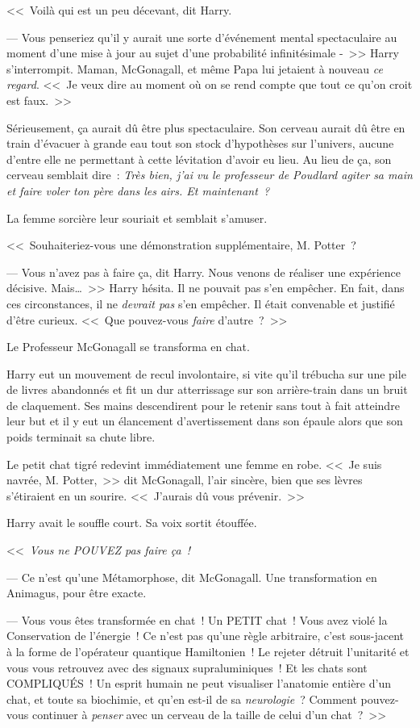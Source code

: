 <<~Voilà qui est un peu décevant, dit Harry.

--- Vous penseriez qu'il y aurait une sorte d'événement mental spectaculaire au moment d'une mise à jour au sujet d'une probabilité infinitésimale -~>> Harry s'interrompit. Maman, McGonagall, et même Papa lui jetaient à nouveau \emph{ce regard}. <<~Je veux dire au moment où on se rend compte que tout ce qu'on croit est faux.~>>

Sérieusement, ça aurait dû être plus spectaculaire. Son cerveau aurait dû être en train d'évacuer à grande eau tout son stock d'hypothèses sur l'univers, aucune d'entre elle ne permettant à cette lévitation d'avoir eu lieu. Au lieu de ça, son cerveau semblait dire~: \emph{Très bien, j'ai vu le professeur de Poudlard agiter sa main et faire voler ton père dans les airs. Et maintenant~?}

La femme sorcière leur souriait et semblait s'amuser.

<<~Souhaiteriez-vous une démonstration supplémentaire, M. Potter~?

--- Vous n'avez pas à faire ça, dit Harry. Nous venons de réaliser une expérience décisive. Mais…~>> Harry hésita. Il ne pouvait pas s'en empêcher. En fait, dans ces circonstances, il ne \emph{devrait pas} s'en empêcher. Il était convenable et justifié d'être curieux. <<~Que pouvez-vous \emph{faire} d'autre~?~>>

Le Professeur McGonagall se transforma en chat.

Harry eut un mouvement de recul involontaire, si vite qu'il trébucha sur une pile de livres abandonnés et fit un dur atterrissage sur son arrière-train dans un bruit de claquement. Ses mains descendirent pour le retenir sans tout à fait atteindre leur but et il y eut un élancement d'avertissement dans son épaule alors que son poids terminait sa chute libre.

Le petit chat tigré redevint immédiatement une femme en robe. <<~Je suis navrée, M. Potter,~>> dit McGonagall, l'air sincère, bien que ses lèvres s'étiraient en un sourire. <<~J'aurais dû vous prévenir.~>>

Harry avait le souffle court. Sa voix sortit étouffée.

<<~\emph{Vous ne POUVEZ pas faire ça~!}

--- Ce n'est qu'une Métamorphose, dit McGonagall. Une transformation en Animagus, pour être exacte.

--- Vous vous êtes transformée en chat~! Un PETIT chat~! Vous avez violé la Conservation de l'énergie~! Ce n'est pas qu'une règle arbitraire, c'est sous-jacent à la forme de l'opérateur quantique Hamiltonien~! Le rejeter détruit l'unitarité et vous vous retrouvez avec des signaux supraluminiques~! Et les chats sont COMPLIQUÉS~! Un esprit humain ne peut visualiser l'anatomie entière d'un chat, et toute sa biochimie, et qu'en est-il de sa \emph{neurologie}~? Comment pouvez-vous continuer à \emph{penser} avec un cerveau de la taille de celui d'un chat~?~>>

